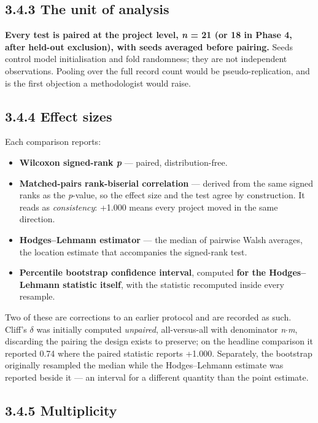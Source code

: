 \subsection{3.4.3 The unit of analysis}\label{the-unit-of-analysis}

\textbf{Every test is paired at the project level, \emph{n} = 21 (or 18
in Phase 4, after held-out exclusion), with seeds averaged before
pairing.} Seeds control model initialisation and fold randomness; they
are not independent observations. Pooling over the full record count
would be pseudo-replication, and is the first objection a methodologist
would raise.

\subsection{3.4.4 Effect sizes}\label{effect-sizes}

Each comparison reports:

\begin{itemize}
\tightlist
\item
  \textbf{Wilcoxon signed-rank \emph{p}} --- paired, distribution-free.
\item
  \textbf{Matched-pairs rank-biserial correlation} --- derived from the
  same signed ranks as the \emph{p}-value, so the effect size and the
  test agree by construction. It reads as \emph{consistency}: +1.000
  means every project moved in the same direction.
\item
  \textbf{Hodges--Lehmann estimator} --- the median of pairwise Walsh
  averages, the location estimate that accompanies the signed-rank test.
\item
  \textbf{Percentile bootstrap confidence interval}, computed
  \textbf{for the Hodges--Lehmann statistic itself}, with the statistic
  recomputed inside every resample.
\end{itemize}

Two of these are corrections to an earlier protocol and are recorded as
such. Cliff's \ensuremath{\delta} was initially computed \emph{unpaired}, all-versus-all
with denominator \emph{n}\ensuremath{\cdot}\emph{m}, discarding the pairing the design
exists to preserve; on the headline comparison it reported 0.74 where
the paired statistic reports +1.000. Separately, the bootstrap
originally resampled the median while the Hodges--Lehmann estimate was
reported beside it --- an interval for a different quantity than the
point estimate.

\subsection{3.4.5 Multiplicity}\label{multiplicity}

